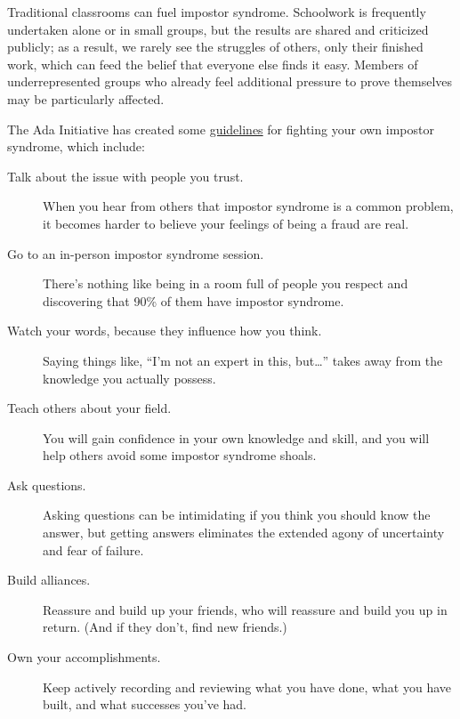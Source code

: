 Traditional classrooms can fuel impostor syndrome.  Schoolwork is
frequently undertaken alone or in small groups, but the results are
shared and criticized publicly; as a result, we rarely see the
struggles of others, only their finished work, which can feed the
belief that everyone else finds it easy.  Members of underrepresented
groups who already feel additional pressure to prove themselves may be
particularly affected.

The Ada Initiative has created some
\href{https://www.usenix.org/blog/impostor-syndrome-proof-yourself-and-your-community}{guidelines}
for fighting your own impostor syndrome, which include:

\begin{description}

\item[Talk about the issue with people you trust.] When you hear from
  others that impostor syndrome is a common problem, it becomes harder
  to believe your feelings of being a fraud are real.

\item[Go to an in-person impostor syndrome session.]  There's nothing
  like being in a room full of people you respect and discovering that
  90\% of them have impostor syndrome.

\item[Watch your words, because they influence how you think.]  Saying
  things like, ``I'm not an expert in this, but{\ldots}'' takes away
  from the knowledge you actually possess.

\item[Teach others about your field.] You will gain confidence in your
  own knowledge and skill, and you will help others avoid some
  impostor syndrome shoals.

\item[Ask questions.] Asking questions can be intimidating if you
  think you should know the answer, but getting answers eliminates the
  extended agony of uncertainty and fear of failure.

\item[Build alliances.] Reassure and build up your friends, who will
  reassure and build you up in return. (And if they don't, find new
  friends.)

\item[Own your accomplishments.] Keep actively recording and reviewing
  what you have done, what you have built, and what successes you've
  had.

\end{description}

